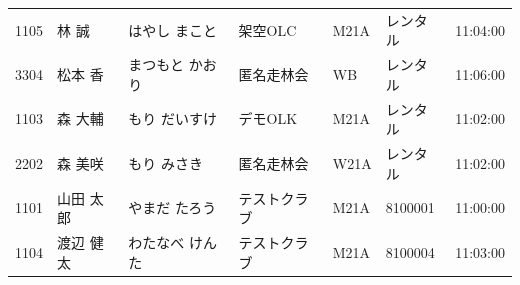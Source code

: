 \documentclass[a4paper,10pt]{ltjsarticle}
\begin{document}
\begin{longtable}{r>{\raggedright\arraybackslash}p{}>{\raggedright\arraybackslash}p{}>{\raggedright\arraybackslash}p{}lll}
1105 & 林 誠 & はやし まこと & 架空OLC & M21A & レンタル & 11:04:00 \\
3304 & 松本 香 & まつもと かおり & 匿名走林会 & WB & レンタル & 11:06:00 \\
1103 & 森 大輔 & もり だいすけ & デモOLK & M21A & レンタル & 11:02:00 \\
2202 & 森 美咲 & もり みさき & 匿名走林会 & W21A & レンタル & 11:02:00 \\
1101 & 山田 太郎 & やまだ たろう & テストクラブ & M21A & 8100001 & 11:00:00 \\
1104 & 渡辺 健太 & わたなべ けんた & テストクラブ & M21A & 8100004 & 11:03:00 \\
\end{longtable}
\end{document}
